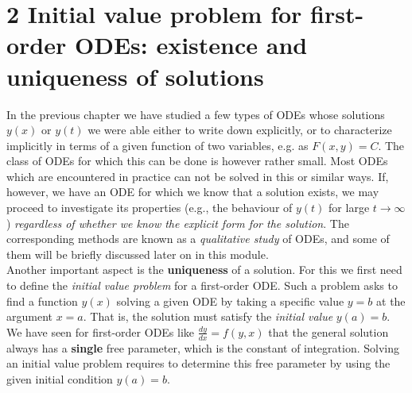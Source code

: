 \documentclass[11pt,a4paper,twoside]{report}
\begin{document}
	\pagestyle{empty}
	\mytitle

	\pagestyle{fancy}
	\fancyhead[LE,RO]{\thepage}
	\fancyhead[LO]{\nouppercase \rightmark}

  \chapter*{2 Initial value problem for first-order ODEs: existence and uniqueness of solutions}
	In the previous chapter we have studied a few types of ODEs whose solutions $y(x)$ or $y(t)$ we were able either to write down explicitly, or to characterize implicitly in terms of a given function of two variables, e.g. as $F(x, y) = C$. The class of ODEs for which this can be done is however rather small. Most ODEs which are encountered in practice can not be solved in this or similar ways. If, however, we have an ODE for which we know that a solution exists, we may proceed to investigate its properties (e.g., the behaviour of $y(t)$ for large $t \to \infty$) \textit{regardless of whether we know the explicit form for the solution}. The corresponding methods are known as a \textit{qualitative study} of ODEs, and some of them will be briefly discussed later on in this module.\\
	Another important aspect is the \textbf{uniqueness} of a solution. For this we first need to define the \textit{initial value problem} for a first-order ODE. Such a problem asks to find a function $y(x)$ solving a given ODE by taking a specific value $y = b$ at the argument $x = a$. That is, the solution must satisfy the \textit{initial value} $y(a) = b$. We have seen for first-order ODEs like $\frac{dy}{dx} = f(y, x)$ that the general solution always has a \textbf{single} free parameter, which is the constant of integration. Solving an initial value problem requires to determine this free parameter by using the given initial condition $y(a) = b$.
\end{document}
